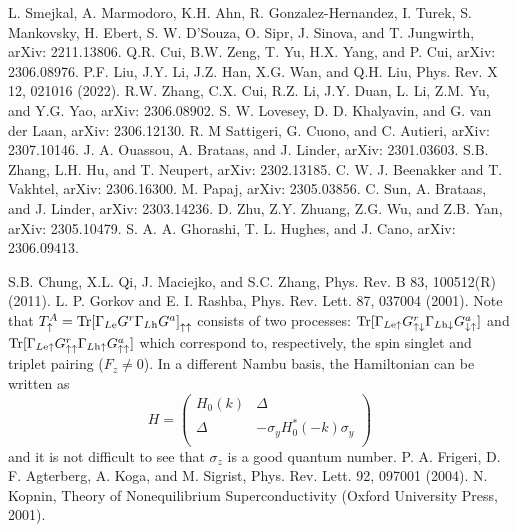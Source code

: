 \documentclass[aps, prb, twocolumn, amssymb, amsmath, showpacs, superscriptaddress]{revtex4-1}
\begin{document}
\begin{thebibliography}{00}
L. Smejkal, A. Marmodoro, K.H. Ahn, R. Gonzalez-Hernandez, I. Turek, S. Mankovsky, H. Ebert, S. W. D'Souza, O. Sipr, J. Sinova, and T. Jungwirth, arXiv: 2211.13806.
Q.R. Cui, B.W. Zeng, T. Yu, H.X. Yang, and P. Cui, arXiv: 2306.08976.
P.F. Liu, J.Y. Li, J.Z. Han, X.G. Wan, and Q.H. Liu, Phys. Rev. X 12, 021016 (2022).
 R.W. Zhang, C.X. Cui, R.Z. Li, J.Y. Duan, L. Li, Z.M. Yu, and Y.G. Yao, arXiv: 2306.08902.
 S. W. Lovesey, D. D. Khalyavin, and G. van der Laan, arXiv: 2306.12130.
 R. M Sattigeri, G. Cuono, and C. Autieri, arXiv: 2307.10146.
J. A. Ouassou, A. Brataas, and J. Linder, arXiv: 2301.03603.
S.B. Zhang, L.H. Hu, and T. Neupert, arXiv: 2302.13185.
C. W. J. Beenakker and T. Vakhtel, arXiv: 2306.16300.
M. Papaj, arXiv: 2305.03856.
C. Sun, A. Brataas, and J. Linder, arXiv: 2303.14236.
D. Zhu, Z.Y. Zhuang, Z.G. Wu, and Z.B. Yan, arXiv: 2305.10479.
S. A. A. Ghorashi, T. L. Hughes, and J. Cano, arXiv: 2306.09413.





S.B. Chung, X.L. Qi, J. Maciejko, and S.C. Zhang, Phys. Rev. B 83, 100512(R) (2011).
L. P. Gorkov and E. I. Rashba, Phys. Rev. Lett. 87, 037004 (2001).
Note that $T_{\uparrow}^{A}={\rm Tr}{[ {{\Gamma }_{L\text{e}}}{{G}^{r}}{{\Gamma }_{L\text{h}}}{{G}^{a}} ]}_{\uparrow\uparrow}$ consists of two processes: ${\rm Tr}[ \Gamma_{L\text{e}\uparrow} G^r_{\uparrow\downarrow} \Gamma_{L\text{h}\downarrow} G^{a}_{\downarrow\uparrow}]$ and ${\rm Tr}[ \Gamma_{L\text{e}\uparrow} G^r_{\uparrow\uparrow} \Gamma_{L\text{h}\uparrow} G^{a}_{\uparrow\uparrow}]$ which correspond to, respectively, the spin singlet and triplet pairing ($F_z \ne 0$).
In a different Nambu basis, the Hamiltonian can be written as\cite{Beenakker}
\begin{equation}
H = \left( \begin{matrix}
   {{H}_{0}}( k ) & \Delta   \\
   \Delta  & -\sigma_y H_{0}^{*}( -k )\sigma_y  \\
\end{matrix} \right)
\nonumber
\end{equation}
and it is not difficult to see that $\sigma_z$ is a good quantum number.
P. A. Frigeri, D. F. Agterberg, A. Koga, and M. Sigrist, Phys. Rev. Lett. 92, 097001 (2004).
N. Kopnin, Theory of Nonequilibrium Superconductivity (Oxford University Press, 2001).



\end{thebibliography}
\end{document}
